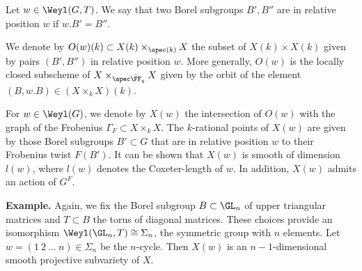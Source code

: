 \begin{defi}\label{def:BorelsInRelPos}
  Let $w \in \Weyl(G, T)$. 
  We say that two Borel subgroups $B', B''$ are in relative position $w$ if 
  $w.B' = B''$. 
\end{defi}

We denote by $O(w)(k) \subset X(k) \times_{\spec(k)} X$ the subset
of $X(k) \times X(k)$ given by pairs $(B', B'')$ in relative position $w$. 
More generally, $O(w)$ is the locally closed subscheme of $X \times_{\spec \bar
\FF_q} X$ given by the orbit of the element $(B, w. B) \in (X \times_k X)(k)$. 

For $w \in \Weyl(G)$, we denote by $X(w)$ the intersection of $O(w)$ with the graph
of the Frobenius $\Gamma_F \subset X \times_k X$. The $k$-rational points of $X(w)$ 
are given by those Borel subgroups $B' \subset G$ that are in relative 
position $w$ to their Frobenius twist $F(B')$. It can be shown that 
$X(w)$ is smooth of dimension $l(w)$, where $l(w)$ denotes the Coxeter-length
of $w$. In addition, $X(w)$ admits an action of $G^F$. 

\textbf{Example.}
Again, we fix the Borel subgroup $B \subset \GL_n$ of upper triangular matrices
and $T \subset B$ the torus of diagonal matrices. These choices provide an isomorphism
$\Weyl(\GL_n,T) \cong \Sigma_n$, the symmetric group with $n$ elements.
Let $w = (1\ 2\ \dots\ n) \in \Sigma_n$ be the $n$-cycle. Then $X(w)$ is an
$n-1$-dimensional
smooth projective subvariety of $X$. 


